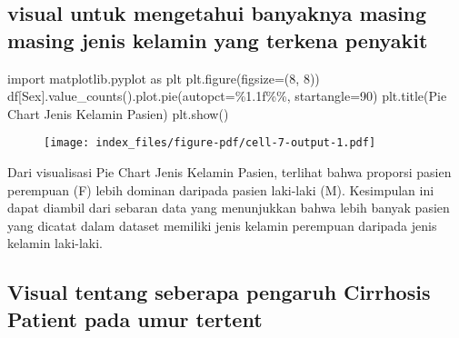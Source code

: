 \documentclass[
  letterpaper,
]{krantz}
\makeatletter
\newenvironment{Shaded}{\begin{snugshade}}{\end{snugshade}}
\newcommand{\DecValTok}[1]{\textcolor[rgb]{0.68,0.00,0.00}{#1}}
\newcommand{\ImportTok}[1]{\textcolor[rgb]{0.00,0.46,0.62}{#1}}
\newcommand{\NormalTok}[1]{\textcolor[rgb]{0.00,0.23,0.31}{#1}}
\newcommand{\OperatorTok}[1]{\textcolor[rgb]{0.37,0.37,0.37}{#1}}
\newcommand{\SpecialCharTok}[1]{\textcolor[rgb]{0.37,0.37,0.37}{#1}}
\newcommand{\StringTok}[1]{\textcolor[rgb]{0.13,0.47,0.30}{#1}}
\newenvironment{kframe}{%
\medskip{}
\setlength{\fboxsep}{.8em}
 \def\at@end@of@kframe{}%
 \ifinner\ifhmode%
  \def\at@end@of@kframe{\end{minipage}}%
  \begin{minipage}{\columnwidth}%
 \fi\fi%
 \def\FrameCommand##1{\hskip\@totalleftmargin \hskip-\fboxsep
 \colorbox{shadecolor}{##1}\hskip-\fboxsep
     \hskip-\linewidth \hskip-\@totalleftmargin \hskip\columnwidth}%
 \MakeFramed {\advance\hsize-\width
   \@totalleftmargin\z@ \linewidth\hsize
   \@setminipage}}%
 {\par\unskip\endMakeFramed%
 \at@end@of@kframe}
\renewenvironment{Shaded}{\begin{kframe}}{\end{kframe}}
\makeatother
\begin{document}

\hypertarget{visual-untuk-mengetahui-banyaknya-masing-masing-jenis-kelamin-yang-terkena-penyakit}{%
\subsection*{visual untuk mengetahui banyaknya masing masing jenis
kelamin yang terkena
penyakit}\label{visual-untuk-mengetahui-banyaknya-masing-masing-jenis-kelamin-yang-terkena-penyakit}}

\begin{Shaded}
\begin{Highlighting}[]
\ImportTok{import}\NormalTok{ matplotlib.pyplot }\ImportTok{as}\NormalTok{ plt}
\NormalTok{plt.figure(figsize}\OperatorTok{=}\NormalTok{(}\DecValTok{8}\NormalTok{, }\DecValTok{8}\NormalTok{))}
\NormalTok{df[}\StringTok{\textquotesingle{}Sex\textquotesingle{}}\NormalTok{].value\_counts().plot.pie(autopct}\OperatorTok{=}\StringTok{\textquotesingle{}}\SpecialCharTok{\%1.1f\%\%}\StringTok{\textquotesingle{}}\NormalTok{, startangle}\OperatorTok{=}\DecValTok{90}\NormalTok{)}
\NormalTok{plt.title(}\StringTok{\textquotesingle{}Pie Chart Jenis Kelamin Pasien\textquotesingle{}}\NormalTok{)}
\NormalTok{plt.show()}
\end{Highlighting}
\end{Shaded}

\begin{figure}[H]

{\centering \texttt{[image: index\_files/figure-pdf/cell-7-output-1.pdf]}

}

\end{figure}

Dari visualisasi Pie Chart Jenis Kelamin Pasien, terlihat bahwa proporsi
pasien perempuan (F) lebih dominan daripada pasien laki-laki (M).
Kesimpulan ini dapat diambil dari sebaran data yang menunjukkan bahwa
lebih banyak pasien yang dicatat dalam dataset memiliki jenis kelamin
perempuan daripada jenis kelamin laki-laki.

\hypertarget{visual-tentang-seberapa-pengaruh-cirrhosis-patient-pada-umur-tertent}{%
\subsection*{Visual tentang seberapa pengaruh Cirrhosis Patient pada
umur
tertent}\label{visual-tentang-seberapa-pengaruh-cirrhosis-patient-pada-umur-tertent}}
\end{document}
